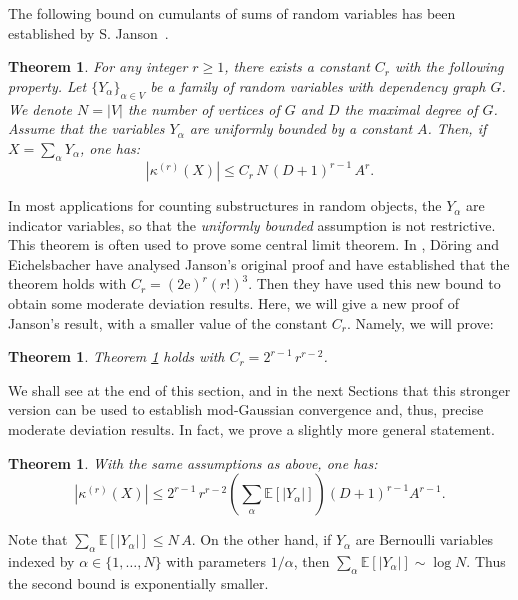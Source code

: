 \documentclass[12pt,a4paper,reqno]{amsart}
\newtheorem{theorem}[lemma]{Theorem}
\theoremstyle{remark}
\newcommand{\E}{\mathrm{e}}
\newcommand{\esper}{\mathbb{E}}
\begin{document}
The following bound on cumulants of sums of random variables has been established by S. Janson~\cite[Lemma 4]{Jan88}.

\begin{theorem}\label{thm:dependencygraphs}
For any integer $r \ge 1$, there exists a constant $C_r$ with the following property. Let $\{Y_\alpha\}_{\alpha \in V}$ be a family of random variables with dependency graph $G$. We denote $N=|V|$ the number of vertices of $G$ and $D$ the maximal degree of $G$. 
Assume that the variables $Y_\alpha$ are uniformly bounded by a constant $A$. 
Then, if $X=\sum_{\alpha} Y_\alpha$, one has:
$$| \kappa^{(r)}(X)| \leq C_r \, N \, (D+1)^{r-1} \, A^r.$$
\end{theorem}

In most applications for counting substructures in random objects, the $Y_\alpha$ are indicator variables, so that the {\em uniformly bounded} assumption is not restrictive. This theorem is often used to prove some central limit theorem. In \cite{DE12}, D\"oring and  Eichelsbacher have analysed Janson's original proof and have established that the theorem holds with $C_r=(2\E)^r (r!)^3$. Then they have used this new bound to obtain some moderate deviation results. Here, we will give a new proof of Janson's result, with a smaller value of the constant $C_r$. Namely, we will prove:

\begin{theorem}\label{thm:dependencygraphsrefined}
Theorem \ref{thm:dependencygraphs} holds with $C_r=2^{r-1} \,r^{r-2}$.    
\end{theorem}

\noindent We shall see at the end of this section, and in the next Sections that this stronger version can be used to establish mod-Gaussian convergence and, thus, precise moderate deviation results. In fact, we prove a slightly more general statement.

\begin{theorem}
With the same assumptions as above, one has:
    \[ | \kappa^{(r)}(X)| \leq 2^{r-1} \,r^{r-2} \left( \sum_\alpha \esper[|Y_\alpha|] \right) (D+1)^{r-1} A^{r-1}.\]
    \label{thm:dependencygraphs_sumY}
\end{theorem}

\noindent Note that $\sum_\alpha \esper[|Y_\alpha|] \le N \, A$. On the other hand, if $Y_\alpha$ are Bernoulli variables indexed by $\alpha \in \{1,\dots,N\}$ with parameters $1/\alpha$, then $\sum_\alpha \esper[|Y_\alpha|] \sim \log N$. Thus the second bound is exponentially smaller.\medskip
\end{document}
